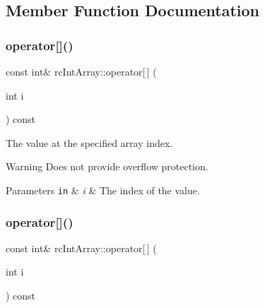\subsection{Member Function Documentation}
\mbox{\label{classrcIntArray_a27c2d32c068dfe3021e0bc4efc2ca04c}} 
\subsubsection{\texorpdfstring{operator[]()}{operator[]()}\hspace{0.1cm}{\footnotesize\ttfamily [1/4]}}
{\footnotesize\ttfamily const int\& rc\+Int\+Array\+::operator\mbox{[}$\,$\mbox{]} (\begin{DoxyParamCaption}\item[{int}]{i }\end{DoxyParamCaption}) const\hspace{0.3cm}{\ttfamily [inline]}}

The value at the specified array index. \begin{DoxyWarning}{Warning}
Does not provide overflow protection. 
\end{DoxyWarning}

\begin{DoxyParams}[1]{Parameters}
\mbox{\tt in}  & {\em i} & The index of the value. \\
\hline
\end{DoxyParams}
\mbox{\label{classrcIntArray_a27c2d32c068dfe3021e0bc4efc2ca04c}} 
\subsubsection{\texorpdfstring{operator[]()}{operator[]()}\hspace{0.1cm}{\footnotesize\ttfamily [2/4]}}
{\footnotesize\ttfamily const int\& rc\+Int\+Array\+::operator\mbox{[}$\,$\mbox{]} (\begin{DoxyParamCaption}\item[{int}]{i }\end{DoxyParamCaption}) const\hspace{0.3cm}{\ttfamily [inline]}}

